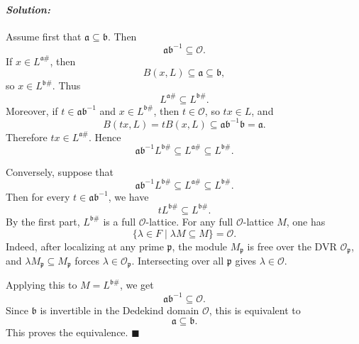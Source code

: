 \documentclass[12pt, a4paper]{article}
\newenvironment{solution}
  {\paragraph{\textit{Solution:}}\par\medskip}
  {\hfill$\blacksquare$\vspace{0.1cm}}
\begin{document}
\begin{solution}
Assume first that \(\mathfrak a\subseteq \mathfrak b\). Then
\[
\mathfrak a\mathfrak b^{-1}\subseteq \mathcal O.
\]
If \(x\in L^{\mathfrak a\#}\), then
\[
B(x,L)\subseteq \mathfrak a\subseteq \mathfrak b,
\]
so \(x\in L^{\mathfrak b\#}\). Thus
\[
L^{\mathfrak a\#}\subseteq L^{\mathfrak b\#}.
\]
Moreover, if \(t\in \mathfrak a\mathfrak b^{-1}\) and
\(x\in L^{\mathfrak b\#}\), then \(t\in\mathcal O\), so \(tx\in L\), and
\[
B(tx,L)=tB(x,L)\subseteq
\mathfrak a\mathfrak b^{-1}\mathfrak b
=
\mathfrak a.
\]
Therefore \(tx\in L^{\mathfrak a\#}\). Hence
\[
\mathfrak a\mathfrak b^{-1}L^{\mathfrak b\#}
\subseteq
L^{\mathfrak a\#}
\subseteq
L^{\mathfrak b\#}.
\]

Conversely, suppose that
\[
\mathfrak a\mathfrak b^{-1}L^{\mathfrak b\#}
\subseteq
L^{\mathfrak a\#}
\subseteq
L^{\mathfrak b\#}.
\]
Then for every \(t\in \mathfrak a\mathfrak b^{-1}\), we have
\[
tL^{\mathfrak b\#}\subseteq L^{\mathfrak b\#}.
\]
By the first part, \(L^{\mathfrak b\#}\) is a full \(\mathcal O\)-lattice.
For any full \(\mathcal O\)-lattice \(M\), one has
\[
\{\lambda\in F\mid \lambda M\subseteq M\}=\mathcal O.
\]
Indeed, after localizing at any prime \(\mathfrak p\), the module
\(M_{\mathfrak p}\) is free over the DVR \(\mathcal O_{\mathfrak p}\), and
\(\lambda M_{\mathfrak p}\subseteq M_{\mathfrak p}\) forces
\(\lambda\in\mathcal O_{\mathfrak p}\). Intersecting over all
\(\mathfrak p\) gives \(\lambda\in\mathcal O\).

Applying this to \(M=L^{\mathfrak b\#}\), we get
\[
\mathfrak a\mathfrak b^{-1}\subseteq \mathcal O.
\]
Since \(\mathfrak b\) is invertible in the Dedekind domain \(\mathcal O\), this
is equivalent to
\[
\mathfrak a\subseteq \mathfrak b.
\]
This proves the equivalence.
\end{solution}
\end{document}
